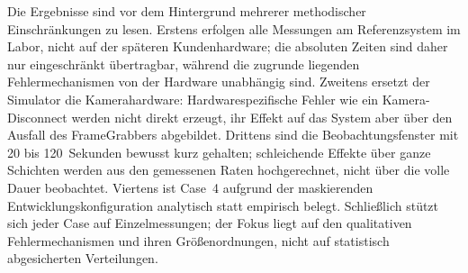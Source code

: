 Die Ergebnisse sind vor dem Hintergrund mehrerer methodischer Einschränkungen zu lesen.
Erstens erfolgen alle Messungen am Referenzsystem im Labor, nicht auf der späteren
Kundenhardware; die absoluten Zeiten sind daher nur eingeschränkt übertragbar, während die
zugrunde liegenden Fehlermechanismen von der Hardware unabhängig sind. Zweitens ersetzt der
Simulator die Kamerahardware: Hardwarespezifische Fehler wie ein Kamera-Disconnect werden
nicht direkt erzeugt, ihr Effekt auf das System aber über den Ausfall des FrameGrabbers
abgebildet. Drittens sind die Beobachtungsfenster mit 20 bis 120~Sekunden bewusst kurz
gehalten; schleichende Effekte über ganze Schichten werden aus den gemessenen Raten
hochgerechnet, nicht über die volle Dauer beobachtet. Viertens ist Case~4 aufgrund der
maskierenden Entwicklungskonfiguration analytisch statt empirisch belegt. Schließlich
stützt sich jeder Case auf Einzelmessungen; der Fokus liegt auf den qualitativen
Fehlermechanismen und ihren Größenordnungen, nicht auf statistisch abgesicherten
Verteilungen.
